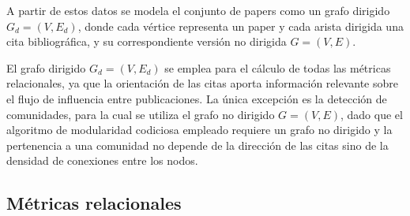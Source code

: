 \documentclass[conference,a4paper]{IEEEtran}
\begin{document}
A partir de estos datos se modela el conjunto de papers como un grafo 
dirigido $G_d = (V, E_d)$, donde cada vértice representa un paper y 
cada arista dirigida una cita bibliográfica, y su correspondiente 
versión no dirigida $G = (V, E)$.

El grafo dirigido $G_d = (V, E_d)$ se emplea para el cálculo de todas 
las métricas relacionales, ya que la orientación de las citas aporta 
información relevante sobre el flujo de influencia entre publicaciones. 
La única excepción es la detección de comunidades, para la cual se 
utiliza el grafo no dirigido $G = (V, E)$, dado que el algoritmo de 
modularidad codiciosa empleado requiere un grafo no dirigido y la 
pertenencia a una comunidad no depende de la dirección de las citas 
sino de la densidad de conexiones entre los nodos.


\subsection{Métricas relacionales}
\end{document}
